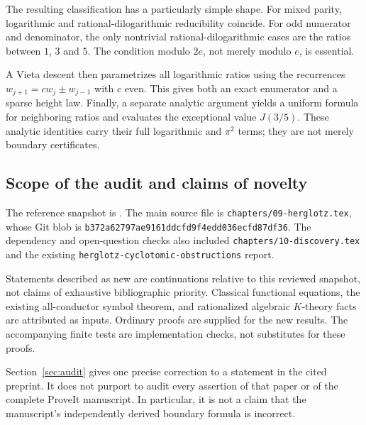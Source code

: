 The resulting classification has a particularly simple shape. For
mixed parity, logarithmic and rational-dilogarithmic reducibility
coincide. For odd numerator and denominator, the only nontrivial
rational-dilogarithmic cases are the ratios between $1$, $3$ and $5$.
The condition modulo $2e$, not merely modulo $e$, is essential.

A Vieta descent then parametrizes all logarithmic ratios using the
recurrences $w_{j+1}=c w_j\pm w_{j-1}$ with $c$ even. This gives both
an exact enumerator and a sparse height law. Finally, a separate analytic
argument yields a uniform formula for neighboring ratios and evaluates
the exceptional value $J(3/5)$.
These analytic identities carry their full logarithmic and $\pi^2$
terms; they are not merely boundary certificates.

\subsection{Scope of the audit and claims of novelty}

The reference snapshot is \snapshot. The main source file is
\nolinkurl{chapters/09-herglotz.tex}, whose Git blob is
\texttt{b372a62797ae9161ddcfd9f4edd036ecfd87df36}. The dependency and
open-question checks also included
\nolinkurl{chapters/10-discovery.tex} and the existing
\nolinkurl{herglotz-cyclotomic-obstructions} report.

Statements described as new are continuations relative to this reviewed
snapshot, not claims of exhaustive bibliographic priority. Classical
functional equations, the existing all-conductor symbol theorem, and
rationalized algebraic $K$-theory facts are attributed as inputs. Ordinary
proofs are supplied for the new results. The accompanying finite tests
are implementation checks, not substitutes for these proofs.

Section~\ref{sec:audit} gives one precise correction to a statement in
the cited preprint. It does not purport to audit every assertion of that
paper or of the complete ProveIt manuscript. In particular, it is not a
claim that the manuscript's independently derived boundary formula is
incorrect.
